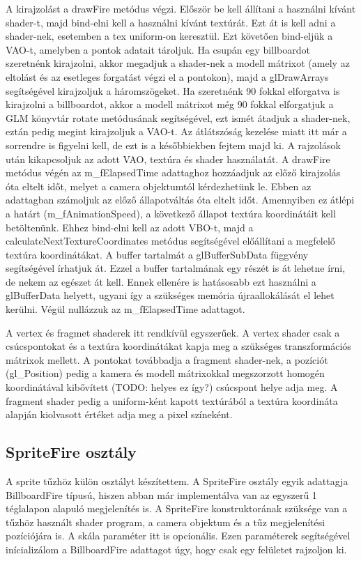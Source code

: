 A kirajzolást a drawFire metódus végzi. Először be kell állítani a használni kívánt shader-t, majd bind-elni kell a használni kívánt textúrát. Ezt át is kell adni a shader-nek, esetemben a tex uniform-on keresztül. Ezt követően bind-eljük a VAO-t, amelyben a pontok adatait tároljuk. Ha csupán egy billboardot szeretnénk kirajzolni, akkor megadjuk a shader-nek a modell mátrixot (amely az eltolást és az esetleges forgatást végzi el a pontokon), majd a glDrawArrays segítségével kirajzoljuk a háromszögeket. Ha szeretnénk 90 fokkal elforgatva is kirajzolni a billboardot, akkor a modell mátrixot még 90 fokkal elforgatjuk a GLM könyvtár rotate metódusának segítségével, ezt ismét átadjuk a shader-nek, eztán pedig megint kirajzoljuk a VAO-t. Az átlátszóság kezelése miatt itt már a sorrendre is figyelni kell, de ezt is a későbbiekben fejtem majd ki. A rajzolások után kikapcsoljuk az adott VAO, textúra és shader használatát. A drawFire metódus végén az m\_fElapsedTime adattaghoz hozzáadjuk az előző kirajzolás óta eltelt időt, melyet a camera objektumtól kérdezhetünk le. Ebben az adattagban számoljuk az előző állapotváltás óta eltelt időt. Amennyiben ez átlépi a határt (m\_fAnimationSpeed), a következő állapot textúra koordinátáit kell betöltenünk. Ehhez bind-elni kell az adott VBO-t, majd a calculateNextTextureCoordinates metódus segítségével előállítani a megfelelő textúra koordinátákat. A buffer tartalmát a glBufferSubData függvény segítségével írhatjuk át. Ezzel a buffer tartalmának egy részét is át lehetne írni, de nekem az egészet át kell. Ennek ellenére is hatásosabb ezt használni a glBufferData helyett, ugyani így a szükséges memória újraallokálását el lehet kerülni. Végül nullázzuk az m\_fElapsedTime adattagot.

A vertex és fragmet shaderek itt rendkívül egyszerűek. A vertex shader csak a csúcspontokat és a textúra koordinátákat kapja meg a szükséges transzformációs mátrixok mellett. A pontokat továbbadja a fragment shader-nek, a pozíciót (gl\_Position) pedig a kamera és modell mátrixokkal megszorzott homogén koordinátával kibővített (TODO: helyes ez így?) csúcspont helye adja meg. A fragment shader pedig a uniform-ként kapott textúrából a textúra koordináta alapján kiolvasott értéket adja meg a pixel színeként. 

\subsection{SpriteFire osztály}
A sprite tűzhöz külön osztályt készítettem. A SpriteFire osztály egyik adattagja BillboardFire típusú, hiszen abban már implementálva van az egyszerű 1 téglalapon alapuló megjelenítés is. A SpriteFire konstruktorának szüksége van a tűzhöz használt shader program, a camera objektum és a tűz megjelenítési pozíciójára is. A skála paraméter itt is opcionális. Ezen paraméterek segítségével inícializálom a BillboardFire adattagot úgy, hogy csak egy felületet rajzoljon ki. 

